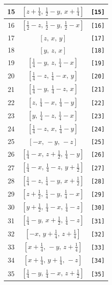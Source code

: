 \documentclass[fleqn,8pt]{jsarticle}
\begin{document}
\begin{longtable}{ccc}
15 & $\left[ z + \frac{1}{4},\, \frac{1}{2} - y,\, x + \frac{1}{4} \right]$ & {\tt [15]} \\ \hline
16 & $\left[ \frac{1}{2} - z,\, \frac{1}{2} - y,\, \frac{1}{2} - x \right]$ & {\tt [16]} \\ \hline
17 & $\left[ z,\, x,\, y \right]$ & {\tt [17]} \\ \hline
18 & $\left[ y,\, z,\, x \right]$ & {\tt [18]} \\ \hline
19 & $\left[ \frac{1}{4} - y,\, z,\, \frac{1}{4} - x \right]$ & {\tt [19]} \\ \hline
20 & $\left[ \frac{1}{4} - z,\, \frac{1}{4} - x,\, y \right]$ & {\tt [20]} \\ \hline
21 & $\left[ \frac{1}{4} - y,\, \frac{1}{4} - z,\, x \right]$ & {\tt [21]} \\ \hline
22 & $\left[ z,\, \frac{1}{4} - x,\, \frac{1}{4} - y \right]$ & {\tt [22]} \\ \hline
23 & $\left[ y,\, \frac{1}{4} - z,\, \frac{1}{4} - x \right]$ & {\tt [23]} \\ \hline
24 & $\left[ \frac{1}{4} - z,\, x,\, \frac{1}{4} - y \right]$ & {\tt [24]} \\ \hline
25 & $\left[ - x,\, - y,\, - z \right]$ & {\tt [25]} \\ \hline
26 & $\left[ \frac{1}{4} - x,\, z + \frac{1}{2},\, \frac{1}{4} - y \right]$ & {\tt [26]} \\ \hline
27 & $\left[ \frac{1}{4} - x,\, \frac{1}{4} - z,\, y + \frac{1}{2} \right]$ & {\tt [27]} \\ \hline
28 & $\left[ \frac{1}{4} - z,\, \frac{1}{4} - y,\, x + \frac{1}{2} \right]$ & {\tt [28]} \\ \hline
29 & $\left[ z + \frac{1}{2},\, \frac{1}{4} - y,\, \frac{1}{4} - x \right]$ & {\tt [29]} \\ \hline
30 & $\left[ y + \frac{1}{2},\, \frac{1}{4} - x,\, \frac{1}{4} - z \right]$ & {\tt [30]} \\ \hline
31 & $\left[ \frac{1}{4} - y,\, x + \frac{1}{2},\, \frac{1}{4} - z \right]$ & {\tt [31]} \\ \hline
32 & $\left[ - x,\, y + \frac{1}{4},\, z + \frac{1}{4} \right]$ & {\tt [32]} \\ \hline
33 & $\left[ x + \frac{1}{4},\, - y,\, z + \frac{1}{4} \right]$ & {\tt [33]} \\ \hline
34 & $\left[ x + \frac{1}{4},\, y + \frac{1}{4},\, - z \right]$ & {\tt [34]} \\ \hline
35 & $\left[ \frac{1}{4} - y,\, \frac{1}{4} - x,\, z + \frac{1}{2} \right]$ & {\tt [35]} \\ \hline

\end{longtable}
\end{document}
